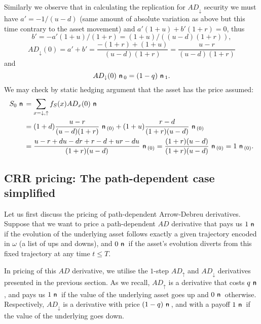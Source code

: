 \documentclass{amsart}
\theoremstyle{definition}
\theoremstyle{remark}
\newcommand{\n}{\!\!\ \nn \!\!\ }
\def\nn{\mathrel{%
    \mathchoice{\n}{\n}{\scriptsize\n}{\tiny\n}%
}}
\def\n {{%
    \setbox0\hbox{ \textsf{n}\!\  }%
    \rlap{\hbox to \wd0{\hss \!\ --\hss}}\box0
}}
\numberwithin{equation}{section}
\newcommand{\1}{\boldsymbol{1}}
\newcommand{\ua}{\uparrow}
\newcommand{\da}{\downarrow}
\begin{document}
Similarly we observe that in calculating the replication for $AD_{\da}$ security we must have
$a'=-1/(u-d)$ (same amount of absolute variation as above but this time contrary to the asset movement) and 
$a' (1+u) + b'(1+r)  =0$, thus 
\[b'=-a'(1+u)/(1+r)=(1+u)/((u-d)(1+r)),\] 
\[AD_\da (0)=a' + b'=\frac{-(1+r) + (1+u)}{(u-d)(1+r)}=\frac{u-r}{(u-d)(1+r)}\]
and 
\[AD_\da (0)  \n_0 = (1-q) \n_1 .\]
We may check by static hedging argument that the asset has the price assumed:
\begin{equation*}
\begin{split}
S_0 \n &=  \sum_{x=\da,\ua} f_S (x) AD_x (0)\n \\
&= (1+d) \frac{u-r}{(u-d)(1+r)}\n_{(0)}+ (1+u) \frac{r-d}{(1+r)(u-d)}\n_{(0)}\\
&=\frac{u-r+du-dr+r-d+ur-du}{(1+r)(u-d)}\n_{(0)}=\frac{(1+r)(u-d)}{(1+r)(u-d)}\n_{(0)}=1\n_{(0)}.
\end{split}
\end{equation*}



\subsection{CRR pricing: The path-dependent case simplified}
\label{Subsection:path-dependentAD}

Let us first discuss the pricing of path-dependent Arrow-Debreu derivatives. Suppose that we want to price a path-dependent $AD$ derivative that pays us $1\n$ if the evolution of the underlying asset follows exactly a given trajectory encoded in $\omega$ (a list of ups and downs), and $0\n$ if the asset's evolution diverts from this fixed trajectory at any time $t\leq T$. 

In pricing of this $AD$ derivative, we utilise the $1$-step $AD_{\ua}$ and $AD_{\da}$ derivatives presented in the previous section. As we recall, $AD_{\ua}$ is a derivative that costs $q\n$, and pays us $1\n$ if the value of the underlying asset goes up and $0\n$ otherwise.
Respectively, $AD_{\da}$ is a derivative with price $(1-q)\n$, and with a payoff $1\n$ if the value of the underlying goes down.
\end{document}
